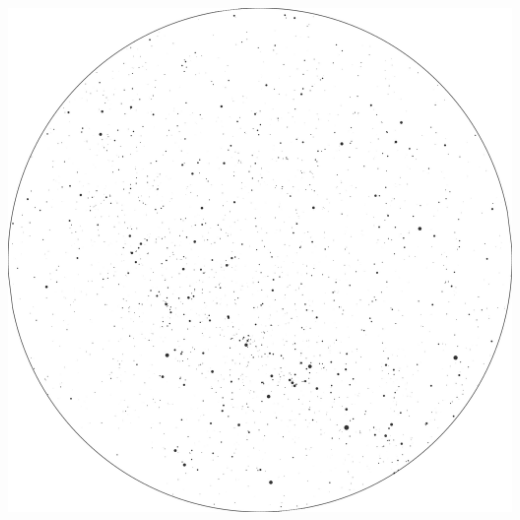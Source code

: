 \documentclass{./SAS-class-skygen}
\begin{document}
	\vspace{0.5cm}
    \begin{center}
    \includegraphics[width=\textwidth]{./pics/skychart22.png}
    \end{center}
    
    
\end{document}
